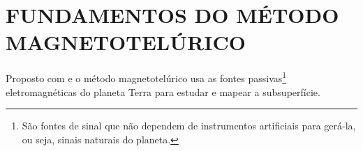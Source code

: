 \chapter{FUNDAMENTOS DO MÉTODO MAGNETOTELÚRICO}

    Proposto com \cite{tikhonov1950determining} e \cite{cagniard1953basic} o método magnetotelúrico usa as fontes passivas\footnote{São fontes de sinal que não dependem de instrumentos artificiais para gerá-la, ou seja, sinais naturais do planeta.} eletromagnéticas do planeta Terra para estudar e mapear a subsuperfície.
    
        

    
        
        
        
        
        
    

